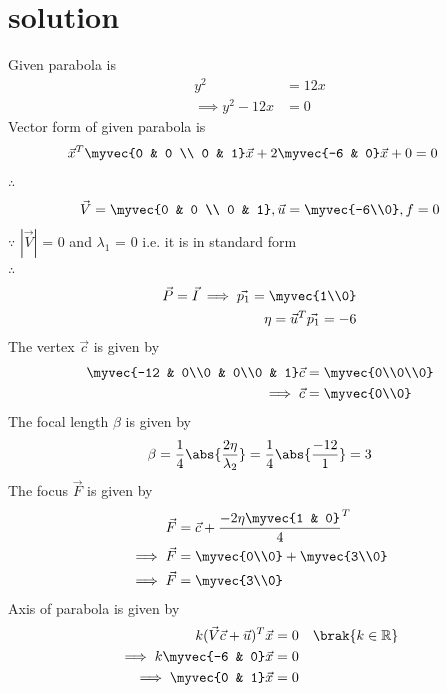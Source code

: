 \documentclass[journal,12pt,twocolumn]{IEEEtran}
\begin{document}
\section{solution}
Given parabola is 
\begin{align}
y^2 &= 12x
\\
\implies y^2 - 12x &= 0
\end{align}
Vector form of given parabola is
\begin{align}
\vec{x}^T\myvec{0 & 0 \\ 0 & 1}\vec{x} + 2\myvec{-6 & 0}\vec{x} + 0 &= 0 
\end{align}
$\therefore$
\begin{align}
 \vec{V} = \myvec{0 & 0 \\ 0 & 1} ,
 \vec{u} = \myvec{-6\\0} ,
 f = 0
\end{align}
$\because$
$|\vec{V}|$ = 0 and $\lambda_1$ = 0 i.e. it is in standard form
\\
$\therefore$
\begin{align}
\vec{P}=\vec{I} \implies \vec{p_1} = \myvec{1\\0}
\\
\eta = \vec{u}^T\vec{p_1} = -6
\end{align}
The vertex $\vec{c}$ is given by
\begin{align}
\myvec{-12 & 0\\0 & 0\\0 & 1}\vec{c} &= \myvec{0\\0\\0}
\\
\implies \vec{c} &= \myvec{0\\0}
\end{align}
The focal length $\beta$ is given by
\begin{align}
\beta = \frac{1}{4}\abs{\frac{2\eta}{\lambda_2}} = \frac{1}{4}\abs{\frac{-12}{1}}= 3
\end{align}
The focus $\vec{F}$ is given by
\begin{align}
\vec{F} &= \vec{c} + {\frac{-2\eta\myvec{1 & 0}}{4}}^{T} 
\\
\implies \vec{F} &= \myvec{0\\0} + \myvec{3\\0}
\\
\implies \vec{F} &= \myvec{3\\0}
\end{align}
Axis of parabola is given by
\begin{align}
k(\vec{V}\vec{c}+\vec{u})^{T}\vec{x} &= 0 \quad\brak{  k \in \mathbb{R}}
\\
\implies k\myvec{-6 & 0}\vec{x} &= 0
\\
\implies \myvec{0 & 1}\vec{x} &= 0
\end{align}
\end{document}
